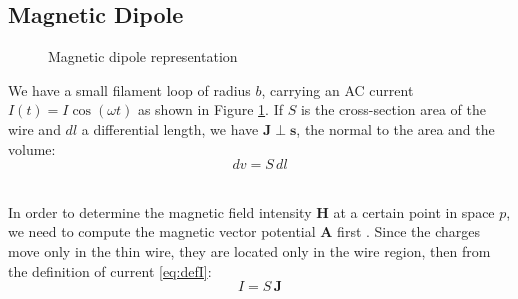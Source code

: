 \documentclass[main]{subfiles}
\begin{document}
\subsection{Magnetic Dipole}
\begin{figure}
    \centering
    \caption{Magnetic dipole representation}
    \label{fig:dipole}
\end{figure}

We have a small filament loop of radius \( b \), 
carrying an AC current \( I(t) = I \cos(\omega t) \) 
as shown in Figure \ref{fig:dipole}. If \( S \) is the 
cross-section area of the wire and \( dl \) a 
differential length, we have \( \mathbf{J} \perp 
\mathbf{s} \), the normal to the area and the volume:
\begin{equation}
 dv = S \, dl
    \label{eq:dvolume}
\end{equation}

\noindent\\
In order to determine the magnetic field intensity 
\(\mathbf{H}\) at a certain point in space \( p \), 
we need to compute the magnetic vector potential 
\(\mathbf{A}\) first \cite{book-magnetism}. Since the 
charges move only in the thin wire, they are located 
only in the wire region, then from the definition of 
current \eqref{eq:defI}:
\[
 I = S \, \mathbf{J}
\]
\end{document}
